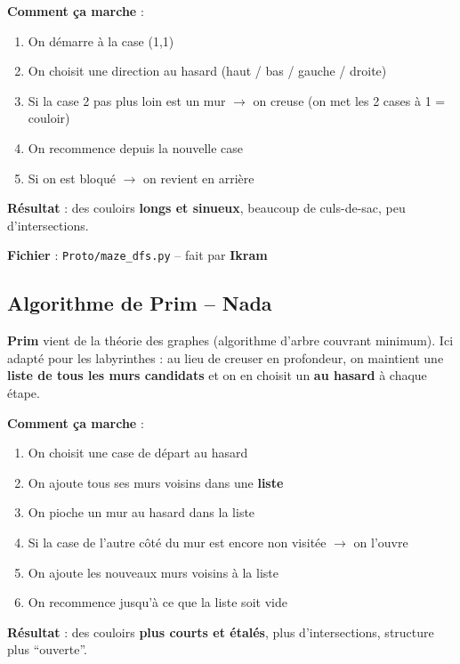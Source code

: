 \documentclass[12pt,a4paper]{article}
\begin{document}
\textbf{Comment ça marche} :
\begin{enumerate}
    \item On démarre à la case (1,1)
    \item On choisit une direction au hasard (haut / bas / gauche / droite)
    \item Si la case 2 pas plus loin est un mur $\rightarrow$ on creuse (on met les 2 cases à 1 = couloir)
    \item On recommence depuis la nouvelle case
    \item Si on est bloqué $\rightarrow$ on revient en arrière
\end{enumerate}

\textbf{Résultat} : des couloirs \textbf{longs et sinueux}, beaucoup de culs-de-sac, peu d'intersections.

\textbf{Fichier} : \texttt{Proto/maze\_dfs.py} -- fait par \textbf{Ikram}

\subsection{Algorithme de Prim -- Nada}

\begin{definitionbox}
\textbf{Prim} vient de la théorie des graphes (algorithme d'arbre couvrant minimum). Ici adapté pour les labyrinthes : au lieu de creuser en profondeur, on maintient une \textbf{liste de tous les murs candidats} et on en choisit un \textbf{au hasard} à chaque étape.
\end{definitionbox}

\textbf{Comment ça marche} :
\begin{enumerate}
    \item On choisit une case de départ au hasard
    \item On ajoute tous ses murs voisins dans une \textbf{liste}
    \item On pioche un mur au hasard dans la liste
    \item Si la case de l'autre côté du mur est encore non visitée $\rightarrow$ on l'ouvre
    \item On ajoute les nouveaux murs voisins à la liste
    \item On recommence jusqu'à ce que la liste soit vide
\end{enumerate}

\textbf{Résultat} : des couloirs \textbf{plus courts et étalés}, plus d'intersections, structure plus ``ouverte''.
\end{document}
